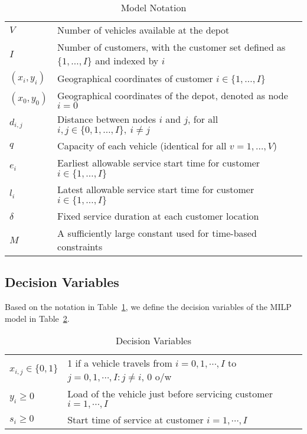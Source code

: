 \documentclass[11pt]{article}
\begin{document}
\begin{table}[htbp]
\centering
\begin{tabular}{ll}
\toprule
$V$ & Number of vehicles available at the depot \\
$I$ & Number of customers, with the customer set defined as $\{1, \ldots, I\}$ and indexed by $i$ \\
$(x_i, y_i)$ & Geographical coordinates of customer $i \in \{1, \ldots, I\}$ \\
$(x_0, y_0)$ & Geographical coordinates of the depot, denoted as node $i = 0$ \\
$d_{i,j}$ & Distance between nodes $i$ and $j$, for all $i, j \in \{0, 1, \ldots, I\},\ i \neq j$ \\
$q$ & Capacity of each vehicle (identical for all $v = 1, \ldots, V$) \\
$e_i$ & Earliest allowable service start time for customer $i \in \{1, \ldots, I\}$ \\
$l_i$ & Latest allowable service start time for customer $i \in \{1, \ldots, I\}$ \\
$\delta$ & Fixed service duration at each customer location \\
$M$ & A sufficiently large constant used for time-based constraints \\
\bottomrule
\end{tabular}
\caption{Model Notation}
\label{tab:notation}
\end{table}

\subsection{Decision Variables}

Based on the notation in Table~\ref{tab:notation}, we define the decision variables of the MILP model in Table~\ref{tab:decision_vars}.

\begin{table}[htbp]
\centering
\begin{tabular}{ll}
\toprule
$x_{i,j} \in \{0,1\}$ & 1 if a vehicle travels from $i = 0, 1, \cdots, I$ to $j = 0, 1, \cdots, I: j \neq i$, 0 o/w \\
$y_i \geq 0$ & Load of the vehicle just before servicing customer $i = 1, \cdots, I$ \\
$s_i \geq 0$ & Start time of service at customer $i = 1, \cdots, I$ \\
\bottomrule
\end{tabular}
\caption{Decision Variables}
\label{tab:decision_vars}
\end{table}
\end{document}
